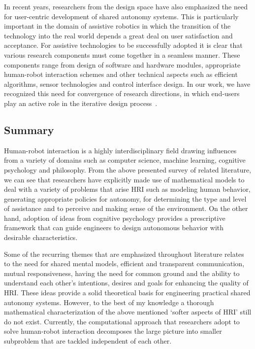 \documentclass[12pt]{article}
\begin{document}
In recent years, researchers from the design space have also emphasized the need for user-centric development of shared autonomy systems. This is particularly important in the domain of assistive robotics in which the transition of the technology into the real world depends a great deal on user satisfaction and acceptance. For assistive technologies to be successfully adopted it is clear that various research components must come together in a seamless manner. These components range from design of software and hardware modules, appropriate human-robot interaction schemes and other technical aspects such as efficient algorithms, sensor technologies and control interface design. In our work, we have recognized this need for convergence of research directions, in which end-users play an active role in the iterative design process~\cite{egli2016call}. 


\subsection{Summary}

Human-robot interaction is a highly interdisciplinary field drawing influences from a variety of domains such as computer science, machine learning, cognitive psychology and philosophy. From the above presented survey of related literature, we can see that researchers have explicitly made use of mathematical models to deal with a variety of problems that arise HRI such as modeling human behavior, generating appropriate policies for autonomy, for determining the type and level of assistance and to perceive and making sense of the environment. On the other hand, adoption of ideas from cognitive psychology provides a prescriptive framework that can guide engineers to design autonomous behavior with desirable characteristics. 

Some of the recurring themes that are emphasized throughout literature relates to the need for shared mental models, efficient and transparent communication, mutual responsiveness, having the need for common ground and the ability to understand each other's intentions, desires and goals for enhancing the quality of HRI. These ideas provide a solid theoretical basis for engineering practical shared autonomy systems. However, to the best of my knowledge a thorough mathematical characterization of the above mentioned `softer aspects of HRI' still do not exist. Currently, the computational approach that researchers adopt to solve human-robot interaction decomposes the large picture into smaller subproblem that are tackled independent of each other. 
\end{document}
